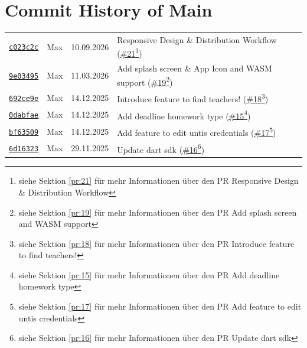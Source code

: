 \documentclass{article}%
\begin{document}
\section{Commit History of Main}%
\label{sec:CommitHistoryofMain}%
\begin{longtable}{l l l p{12cm}}%
\href{https://github.com/scriptor1000/homeworks/commit/c023c2ca9dc2a144916a2f549697af5b979a4efd}{\underline{\texttt{c023c2c}}}&Max&10.09.2026&Responsive Design \& Distribution Workflow (\href{https://github.com/scriptor1000/homeworks/pull/21}{\underline{\#21}}\footnote{siehe Sektion \ref{pr:21} für mehr Informationen über den PR Responsive Design \& Distribution Workflow})\\%
\href{https://github.com/scriptor1000/homeworks/commit/9e03495555abeef310f579e9f1031528c992cbe6}{\underline{\texttt{9e03495}}}&Max&11.03.2026&Add splash screen \& App Icon and WASM support  (\href{https://github.com/scriptor1000/homeworks/pull/19}{\underline{\#19}}\footnote{siehe Sektion \ref{pr:19} für mehr Informationen über den PR Add splash screen and WASM support })\\%
\href{https://github.com/scriptor1000/homeworks/commit/692ce9ec4c585d56ebb31a5394dc8b0f759edfaf}{\underline{\texttt{692ce9e}}}&Max&14.12.2025&Introduce feature to find teachers! (\href{https://github.com/scriptor1000/homeworks/pull/18}{\underline{\#18}}\footnote{siehe Sektion \ref{pr:18} für mehr Informationen über den PR Introduce feature to find teachers!})\\%
\href{https://github.com/scriptor1000/homeworks/commit/0dabfae336480d9b4761ac0d5fe66b758ebb1274}{\underline{\texttt{0dabfae}}}&Max&14.12.2025&Add deadline homework type (\href{https://github.com/scriptor1000/homeworks/pull/15}{\underline{\#15}}\footnote{siehe Sektion \ref{pr:15} für mehr Informationen über den PR Add deadline homework type})\\%
\href{https://github.com/scriptor1000/homeworks/commit/bf6350965aac3bb40487f695a061372c772263ca}{\underline{\texttt{bf63509}}}&Max&14.12.2025&Add feature to edit untis credentials (\href{https://github.com/scriptor1000/homeworks/pull/17}{\underline{\#17}}\footnote{siehe Sektion \ref{pr:17} für mehr Informationen über den PR Add feature to edit untis credentials})\\%
\href{https://github.com/scriptor1000/homeworks/commit/6d16323d9c38903bcf9aa3b2bbff758f849c866a}{\underline{\texttt{6d16323}}}&Max&29.11.2025&Update dart sdk (\href{https://github.com/scriptor1000/homeworks/pull/16}{\underline{\#16}}\footnote{siehe Sektion \ref{pr:16} für mehr Informationen über den PR Update dart sdk})\\%

\end{longtable}
\end{document}
